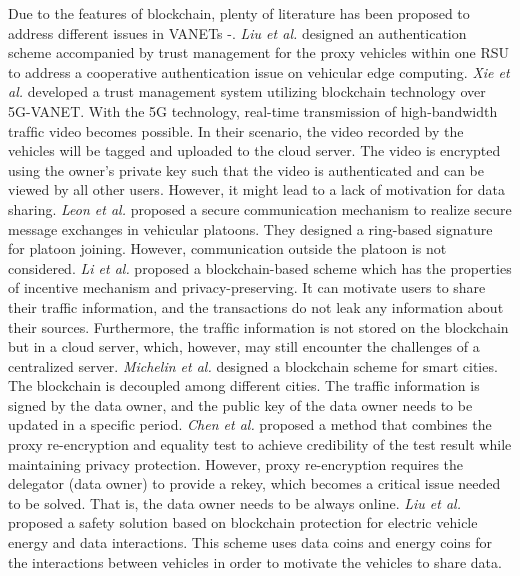 \documentclass[journal]{IEEEtran}
\begin{document}
	Due to the features of blockchain, plenty of literature has been proposed to address different issues in VANETs \cite{BECADT}-\cite{bsi2018}. \emph{Liu et al.} \cite{BECADT} designed an authentication scheme accompanied by trust management for the proxy vehicles within one RSU to address a cooperative authentication issue on vehicular edge computing. \emph{Xie et al.} \cite{BST} developed a trust management system utilizing blockchain technology over 5G-VANET. With the 5G technology, real-time transmission of high-bandwidth trafﬁc video becomes possible. In their scenario, the video recorded by the vehicles will be tagged and uploaded to the cloud server. The video is encrypted using the owner’s private key such that the video is authenticated and can be viewed by all other users. However, it might lead to a lack of motivation for data sharing. \emph{Leon et al.} \cite{sbc2018} proposed a secure communication mechanism to realize secure message exchanges in vehicular platoons. They designed a ring-based signature for platoon joining. However, communication outside the platoon is not considered. \emph{Li et al.} \cite{cap2018} proposed a blockchain-based scheme which has the properties of incentive mechanism and privacy-preserving. It can motivate users to share their traffic information, and the transactions do not leak any information about their sources. Furthermore, the trafﬁc information is not stored on the blockchain but in a cloud server, which, however, may still encounter the challenges of a centralized server. \emph{Michelin et al.} \cite{saf2018} designed a blockchain scheme for smart cities. The blockchain is decoupled among different cities. The traffic information is signed by the data owner, and the public key of the data owner needs to be updated in a specific period. \emph{Chen et al.} \cite{BPREET} proposed a method that combines the proxy re-encryption and equality test to achieve credibility of the test result while maintaining privacy protection. However, proxy re-encryption requires the delegator (data owner) to provide a rekey, which becomes a critical issue needed to be solved. That is, the data owner needs to be always online. \emph{Liu et al.} \cite{bsi2018} proposed a safety solution based on blockchain protection for electric vehicle energy and data interactions. This scheme uses data coins and energy coins for the interactions between vehicles in order to motivate the vehicles to share data.
\end{document}
